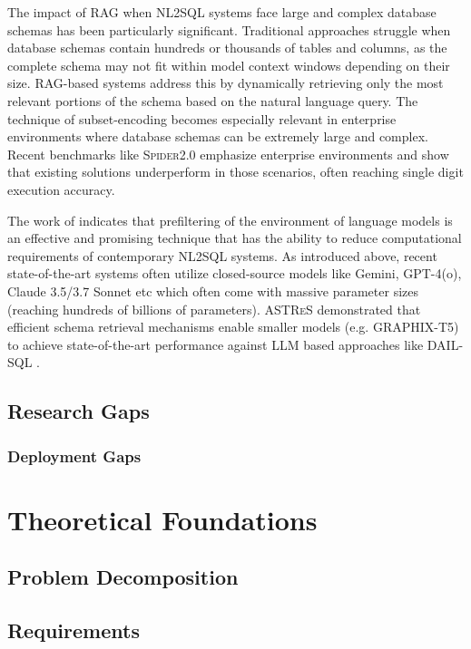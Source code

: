 \documentclass{article}
\begin{document}
The impact of RAG when NL2SQL systems face large and complex database schemas has been particularly significant. Traditional
approaches struggle when database schemas contain hundreds or thousands of tables and columns, as the complete schema may not
fit within model context windows depending on their size. RAG-based systems address this by dynamically retrieving only the most
relevant portions of the schema based on the natural language query. The technique of subset-encoding becomes especially relevant
in enterprise environments where database schemas can be extremely large and complex. Recent benchmarks like \textsc{Spider2.0}
emphasize enterprise environments and show that existing solutions underperform in those scenarios, often reaching single digit
execution accuracy.

The work of \citeauthor{RetAug} indicates that prefiltering of the environment of language models is an effective
and promising technique that has the ability to reduce computational requirements of contemporary NL2SQL systems.
As introduced above, recent state-of-the-art systems often utilize closed-source models like Gemini, GPT-4(o), Claude 3.5/3.7
Sonnet etc which often come with massive parameter sizes (reaching hundreds of billions of parameters). \textsc{ASTReS}
demonstrated that efficient schema retrieval mechanisms enable smaller models (e.g. GRAPHIX-T5) to achieve state-of-the-art
performance against LLM based approaches like DAIL-SQL \citep{DAIL-SQL, RetAug}.

\subsection{Research Gaps}

\subsubsection{Deployment Gaps}

\newpage

\section{Theoretical Foundations}

\subsection{Problem Decomposition}

\subsection{Requirements}
\end{document}
